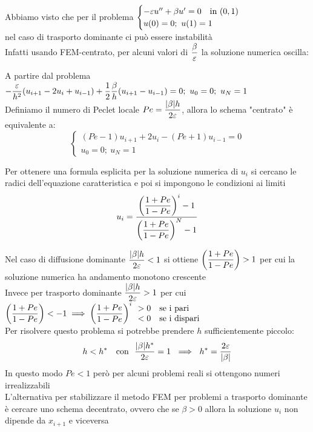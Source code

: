\documentclass{article}
\begin{document}
Abbiamo visto che per il problema $\begin{cases}
    -\varepsilon u'' + \beta u' =0 \ \ \text{ in } (0,1)\\
    u(0)=0; \ u(1)=1
\end{cases}$ \\
nel caso di trasporto dominante ci può essere instabilità\\
Infatti usando FEM-centrato, per alcuni valori di $\dfrac{\beta}{\varepsilon}$ la soluzione numerica oscilla:

A partire dal problema $-\dfrac{\varepsilon}{h^2} (u_{i+1}-2u_i + u_{i-1}) + \dfrac{1}{2} \dfrac{\beta}{h} (u_{i+1}-u_{i-1}) = 0 ; \ u_0=0; \ u_N=1$\\
Definiamo il numero di Peclet locale $Pe=\dfrac{|\beta|h}{2\varepsilon}$, allora lo schema "centrato" è equivalente a:
\[
\begin{cases}
    (Pe-1)u_{i+1} + 2u_i - (Pe+1)u_{i-1}=0\\
    u_0=0; \ u_N=1
\end{cases}
\]
\phantom{}

Per ottenere una formula esplicita per la soluzione numerica di $u_i$ si cercano le radici dell'equazione caratteristica e poi si impongono le condizioni ai limiti
\[
u_i=\dfrac{\left(\dfrac{1+Pe}{1-Pe}\right)^i -1}{\left(\dfrac{1+Pe}{1-Pe}\right)^N -1}
\]
\phantom{}

Nel caso di diffusione dominante $\dfrac{|\beta| h}{2\varepsilon}<1$ si ottiene $\left(\dfrac{1+Pe}{1-Pe}\right)>1$ per cui la soluzione numerica ha andamento monotono crescente\\
Invece per trasporto dominante $\dfrac{|\beta| h}{2\varepsilon}>1$ per cui $\left(\dfrac{1+Pe}{1-Pe}\right) < -1 \implies \left(\dfrac{1+Pe}{1-Pe}\right)^i  \begin{array}{l}
    >0 \ \ \text{ se i pari}\\
    <0 \ \ \text{ se i dispari}
\end{array}$\\

Per risolvere questo problema si potrebbe prendere $h$ sufficientemente piccolo:
\[
h<h^* \ \ \text{ con } \ \frac{|\beta|h^*}{2\eps}=1 \ \implies \ h^*=\frac{2\eps}{|\beta|}
\]
In questo modo $Pe < 1$ però per alcuni problemi reali si ottengono numeri irrealizzabili\\

L'alternativa per stabilizzare il metodo FEM per problemi a trasporto dominante è cercare uno schema decentrato, ovvero che se $\beta>0$ allora la soluzione $u_i$ non dipende da $x_{i+1}$ e viceversa\\
\end{document}
